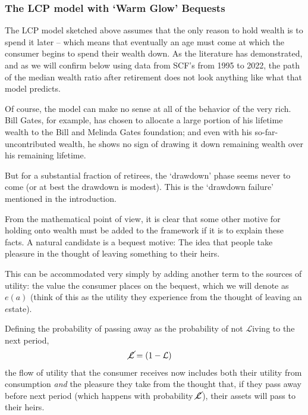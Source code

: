 \documentclass{article}
\newcommand{\Alive}{\mathcal{L}}
\newcommand{\aNrm}{a}
\newcommand{\bqstNrm}{e}
\begin{document}
\subsubsection{The LCP model with `Warm Glow' Bequests}

The LCP model sketched above assumes that the only reason to hold wealth is to spend it later -- which means that eventually an age must come at which the consumer begins to spend their wealth down. As the literature has demonstrated, and as we will confirm below using data from SCF's from 1995 to 2022, the path of the median wealth ratio after retirement does not look anything like what that model predicts.


Of course, the model can make no sense at all of the behavior of the very rich. Bill Gates, for example, has chosen to allocate a large portion of his lifetime wealth to the Bill and Melinda Gates foundation; and even with his so-far-uncontributed wealth, he shows no sign of drawing it down remaining wealth over his remaining lifetime.

But for a substantial fraction of retirees, the `drawdown' phase seems never to come (or at best the drawdown is modest).  This is the `drawdown failure' mentioned in the introduction.


% 
%

From the mathematical point of view, it is clear that some other motive for holding onto wealth must be added to the framework if it is to explain these facts. A natural candidate is a bequest motive: The idea that people take pleasure in the thought of leaving something to their heirs.

This can be accommodated very simply by adding another term to the sources of utility: the value the consumer places on the bequest, which we will denote as $\bqstNrm(\aNrm)$ (think of this as the utility they experience from the thought of leaving an $\bqstNrm$state).

Defining the probability of passing away as the probability of not $\Alive$iving to the next period,
\begin{align}
    \cancel{\Alive} & =(1-\Alive)
\end{align}
the flow of utility that the consumer receives now includes both their utility from consumption \textit{and} the pleasure they take from the thought that, if they pass away before next period (which happens with probability $\cancel{\Alive}$), their assets will pass to their heirs.
\end{document}
